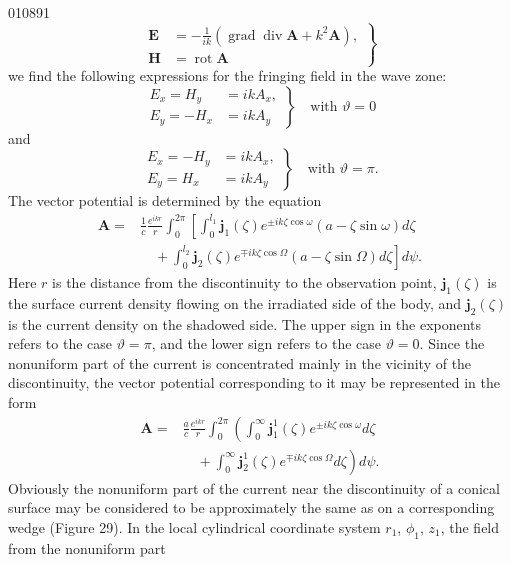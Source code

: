 \begin{scanpage}{0108}{91}
\[\left.\begin{aligned}\mathbf E&=-\frac1{ik}(\operatorname{grad}\operatorname{div}\mathbf A+k^2\mathbf A),\\\mathbf H&=\operatorname{rot}\mathbf A\end{aligned}\right\}\tag{16.01}\]
we find the following expressions for the fringing field in the wave zone:
\[\left.\begin{aligned}E_x=H_y&=ikA_x,\\E_y=-H_x&=ikA_y\end{aligned}\right\}\quad\text{with }\vartheta=0\tag{16.02}\]
and
\[\left.\begin{aligned}E_x=-H_y&=ikA_x,\\E_y=H_x&=ikA_y\end{aligned}\right\}\quad\text{with }\vartheta=\pi.\tag{16.03}\]
The vector potential is determined by the equation
\[\begin{aligned}\mathbf A={}&\frac1c\frac{e^{ikr}}r\int_0^{2\pi}\left[\int_0^{l_1}\mathbf j_1(\zeta)e^{\pm ik\zeta\cos\omega}(a-\zeta\sin\omega)d\zeta\right.\\&\left.\quad+\int_0^{l_2}\mathbf j_2(\zeta)e^{\mp ik\zeta\cos\Omega}(a-\zeta\sin\Omega)d\zeta\right]d\psi.\end{aligned}\tag{16.04}\]
Here $r$ is the distance from the discontinuity to the observation point, $\mathbf j_1(\zeta)$ is the surface current density flowing on the irradiated side of the body, and $\mathbf j_2(\zeta)$ is the current density on the shadowed side. The upper sign in the exponents refers to the case $\vartheta=\pi$, and the lower sign refers to the case $\vartheta=0$. Since the nonuniform part of the current is concentrated mainly in the vicinity of the discontinuity, the vector potential corresponding to it may be represented in the form
\[\begin{aligned}\mathbf A={}&\frac ac\frac{e^{ikr}}r\int_0^{2\pi}\left(\int_0^\infty\mathbf j_1^1(\zeta)e^{\pm ik\zeta\cos\omega}d\zeta\right.\\&\left.\quad+\int_0^\infty\mathbf j_2^1(\zeta)e^{\mp ik\zeta\cos\Omega}d\zeta\right)d\psi.\end{aligned}\tag{16.05}\]
Obviously the nonuniform part of the current near the discontinuity of a conical surface may be considered to be approximately the same as on a corresponding wedge (Figure 29). In the local cylindrical coordinate system $r_1$, $\phi_1$, $z_1$, the field from the nonuniform part
\end{scanpage}
